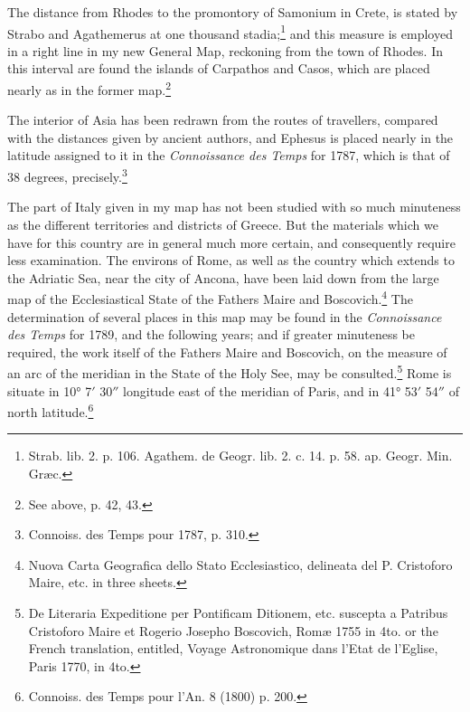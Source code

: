 \documentclass[a4paper, 11pt, oneside, polutonikogreek, english]{article}
\begin{document}
The distance from Rhodes to the promontory of Samonium in Crete, is stated by Strabo and Agathemerus at one thousand stadia;\footnote{Strab. lib. 2. p. 106. Agathem. de Geogr. lib. 2. c. 14. p. 58. ap. Geogr. Min. Græc.} and this measure is employed in a right line in my new General Map, reckoning from the town of Rhodes. In this interval are found the islands of Carpathos and Casos, which are placed nearly as in the former map.\footnote{See above, p. 42, 43.}

The interior of Asia has been redrawn from the routes of travellers, compared with the distances given by ancient authors, and Ephesus is placed nearly in the latitude assigned to it in the \emph{Connoissance des Temps} for 1787, which is that of 38 degrees, precisely.\footnote{Connoiss. des Temps pour 1787, p. 310.}

The part of Italy given in my map has not been studied with so much minuteness as the different territories and districts of Greece. But the materials which we have for this country are in general much more certain, and consequently require less examination. The environs of Rome, as well as the country which extends to the Adriatic Sea, near the city of Ancona, have been laid down from the large map of the Ecclesiastical State of the Fathers Maire and Boscovich.\footnote{Nuova Carta Geografica dello Stato Ecclesiastico, delineata del P. Cristoforo Maire, etc. in three sheets.} The determination of several places in this map may be found in the \emph{Connoissance des Temps} for 1789, and the following years; and if greater minuteness be required, the work itself of the Fathers Maire and Boscovich, on the measure of an arc of the meridian in the State of the Holy See, may be consulted.\footnote{De Literaria Expeditione per Pontificam Ditionem, etc. suscepta a Patribus Cristoforo Maire et Rogerio Josepho Boscovich, Romæ 1755 in 4to. or the French translation, entitled, Voyage Astronomique dans l'Etat de l'Eglise, Paris 1770, in 4to.} Rome is situate in 10° 7$'$ 30$''$ longitude east of the meridian of Paris, and in 41° 53$'$ 54$''$ of north latitude.\footnote{Connoiss. des Temps pour l'An. 8 (1800) p. 200.}
\end{document}
